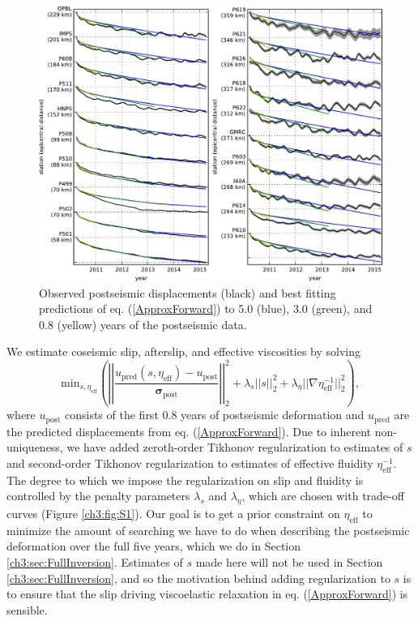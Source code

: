 \begin{figure}
\includegraphics[scale=1.0]{ch3/figures/2016jb013114-p10}
\caption{Observed postseismic displacements (black) and best fitting
predictions of eq. (\ref{ApproxForward}) to 5.0 (blue), 3.0 (green),
and 0.8 (yellow) years of the postseismic data.}
\label{ch3:fig:RecordSection1}
\end{figure}

We estimate coseismic slip, afterslip, and effective viscosities by
solving
\begin{equation}\label{ObjectiveFunction}
 \mathrm{min}_{s,\eta_\mathrm{eff}} \left(\left|\left|
 \frac{u_\mathrm{pred}(s,\eta_\mathrm{eff}) - u_\mathrm{post}}
 {\mathbf{\sigma_\mathrm{post}}}\right|\right|_2^2 + 
 \lambda_s||s||_2^2 + 
 \lambda_\eta||\nabla \eta_{\mathrm{eff}}^{-1}||_2^2\right),
\end{equation} 
where $u_\mathrm{post}$ consists of the first 0.8 years of postseismic
deformation and $u_\mathrm{pred}$ are the predicted displacements from
eq. (\ref{ApproxForward}).  Due to inherent non-uniqueness, we have
added zeroth-order Tikhonov regularization to estimates of $s$ and
second-order Tikhonov regularization to estimates of effective
fluidity $\eta_\mathrm{eff}^{-1}$. The degree to which we impose the
regularization on slip and fluidity is controlled by the penalty
parameters $\lambda_s$ and $\lambda_\eta$, which are chosen with
trade-off curves (Figure \ref{ch3:fig:S1}).  Our goal is to get a prior constraint
on $\eta_{\mathrm{eff}}$ to minimize the amount of searching we have
to do when describing the postseismic deformation over the full five
years, which we do in Section \ref{ch3:sec:FullInversion}.  Estimates
of $s$ made here will not be used in Section
\ref{ch3:sec:FullInversion}, and so the motivation behind adding
regularization to $s$ is to ensure that the slip driving viscoelastic
relaxation in eq. (\ref{ApproxForward}) is sensible.

